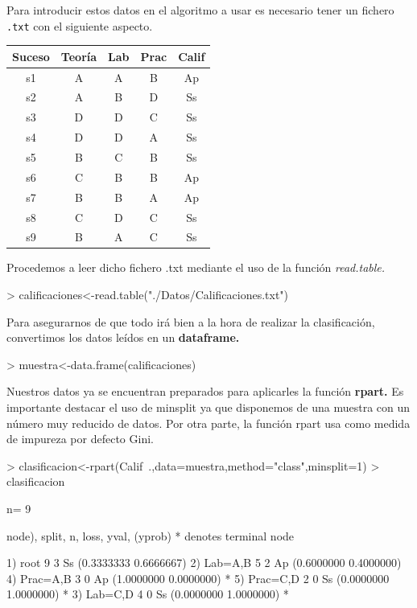 \documentclass [a4paper] {article}
\begin{document}
\bigskip
Para introducir estos datos en el algoritmo a usar es necesario tener un fichero \texttt{.txt} con el
siguiente aspecto.
\begin{table}[H]
\begin{center}
\begin{tabular}{|c|c|c|c|c|}
\hline
Suceso & Teoría & Lab & Prac & Calif\\
\hline \hline
s1 & A & A & B & Ap \\ \hline
s2 & A & B & D & Ss \\ \hline
s3 & D & D & C & Ss \\ \hline
s4 & D & D & A & Ss \\ \hline
s5 & B & C & B & Ss \\ \hline
s6 & C & B & B & Ap \\ \hline
s7 & B & B & A & Ap \\ \hline
s8 & C & D & C & Ss \\ \hline
s9 & B & A & C & Ss \\ \hline
\end{tabular}
\end{center}
\end{table}

\bigskip
Procedemos a leer dicho fichero .txt mediante el uso de la función \textit{read.table.}
\begin{Schunk}
\begin{Sinput}
> calificaciones<-read.table("./Datos/Calificaciones.txt")
\end{Sinput}
\end{Schunk}

\bigskip
Para asegurarnos de que todo irá bien a la hora de realizar la clasificación, convertimos los datos
leídos en un \textbf{dataframe.}
\begin{Schunk}
\begin{Sinput}
> muestra<-data.frame(calificaciones)
\end{Sinput}
\end{Schunk}

\bigskip
Nuestros datos ya se encuentran preparados para aplicarles la función \textbf{rpart.} Es importante destacar
el uso de minsplit ya que disponemos de una muestra con un número muy reducido de datos. Por otra parte, la función
rpart usa como medida de impureza por defecto Gini.
\begin{Schunk}
\begin{Sinput}
> clasificacion<-rpart(Calif~.,data=muestra,method="class",minsplit=1)
> clasificacion
\end{Sinput}
\begin{Soutput}
n= 9 

node), split, n, loss, yval, (yprob)
      * denotes terminal node

1) root 9 3 Ss (0.3333333 0.6666667)  
  2) Lab=A,B 5 2 Ap (0.6000000 0.4000000)  
    4) Prac=A,B 3 0 Ap (1.0000000 0.0000000) *
    5) Prac=C,D 2 0 Ss (0.0000000 1.0000000) *
  3) Lab=C,D 4 0 Ss (0.0000000 1.0000000) *
\end{Soutput}
\end{Schunk}
\end{document}
